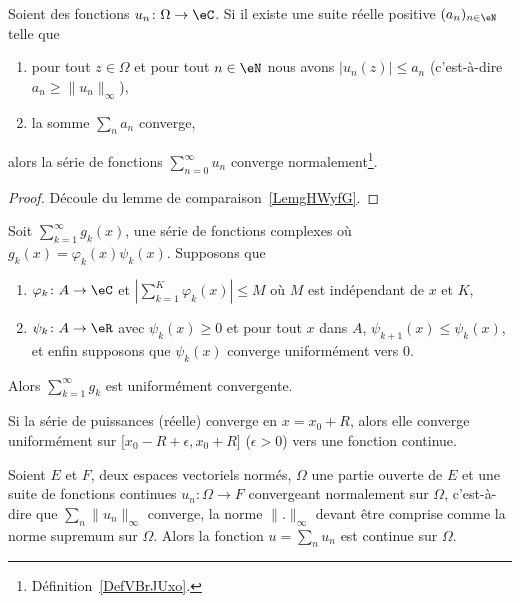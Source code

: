 \begin{lemma}
	Soient des fonctions \( u_n\colon \Omega\to \eC\). Si il existe une suite réelle positive \( (a_n)_{n\in \eN}\) telle que
	\begin{enumerate}
		\item
		      pour tout \( z\in \Omega\) et pour tout \( n\in \eN\) nous avons \( | u_n(z) |\leq a_n\) (c'est-à-dire \( a_n\geq \| u_n \|_{\infty}\)),
		\item
		      la somme \( \sum_{n}a_n\) converge,
	\end{enumerate}
	alors la série de fonctions \( \sum_{n=0}^{\infty}u_n\) converge normalement\footnote{Définition~\ref{DefVBrJUxo}.}.
\end{lemma}

\begin{proof}
	Découle du lemme de comparaison~\ref{LemgHWyfG}.
\end{proof}

\begin{theorem}				\label{ThoSerCritAbel}
	Soit \( \sum_{k=1}^{\infty}g_k(x)\), une série de fonctions complexes où \( g_k(x)=\varphi_k(x)\psi_k(x)\). Supposons que
	\begin{enumerate}

		\item
		      \( \varphi_k\colon A\to \eC\) et \( | \sum_{k=1}^K\varphi_k(x) |\leq M\) où \( M\) est indépendant de \( x\) et \( K\),
		\item
		      \( \psi_k\colon A\to \eR\) avec \( \psi_k(x)\geq 0\) et pour tout \( x\) dans \( A\), \( \psi_{k+1}(x)\leq \psi_k(x)\), et enfin supposons que \( \psi_k(x)\) converge uniformément vers \( 0\).

	\end{enumerate}
	Alors \( \sum_{k=1}^{\infty}g_k\) est uniformément convergente.
\end{theorem}

\begin{theorem}		\label{ThoAbelSeriePuiss}
	Si la série de puissances (réelle) converge en \( x=x_0+R\), alors elle converge uniformément sur \( \mathopen[ x_0-R+\epsilon , x_0+R \mathclose]\) (\( \epsilon>0\)) vers une fonction continue.
\end{theorem}

\begin{proposition} \label{PropOMBbwst}
	Soient \( E\) et \( F\), deux espaces vectoriels normés, \( \Omega\) une partie ouverte de \( E\) et une suite de fonctions continues \( u_n\colon \Omega\to F\) convergeant normalement sur \( \Omega\), c'est-à-dire que \( \sum_n\| u_n \|_{\infty}\) converge, la norme \( \| . \|_{\infty} \) devant être comprise comme la norme supremum sur \( \Omega\). Alors la fonction \( u=\sum_nu_n\) est continue sur \( \Omega\).
\end{proposition}

